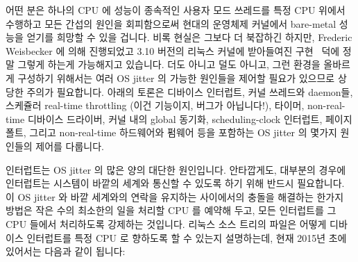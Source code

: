 어떤 분은 하나의 CPU 에 성능이 종속적인 사용자 모드 쓰레드를 특정 CPU 위에서
수행하고 모든 간섭의 원인을 회피함으로써 현대의 운영체제 커널에서 bare-metal
성능을 얻기를 희망할 수 있을 겁니다.
비록 현실은 그보다 더 북잡하긴 하지만, Frederic Weisbecker 에 의해 진행되었고
3.10 버전의 리눅스 커널에 받아들여진 
구현~\cite{JonCorbet2013NO-HZ-FULL} 덕에 정말 그렇게 하는게 가능해지고
있습니다.
더도 아니고 덜도 아니고, 그런 환경을 올바르게 구성하기 위해서는 여러 OS jitter
의 가능한 원인들을 제어할 필요가 있으므로 상당한 주의가 필요합니다.
아래의 토론은 디바이스 인터럽트, 커널 쓰레드와 daemon들, 스케쥴러 real-time
throttling (이건 기능이지, 버그가 아닙니다!), 타이머, non-real-time 디바이스
드라이버, 커널 내의 global 동기화, scheduling-clock 인터럽트, 페이지 폴트,
그리고 non-real-time 하드웨어와 펌웨어 등을 포함하는 OS jitter 의 몇가지
원인들의 제어를 다룹니다. 

인터럽트는 OS jitter 의 많은 양의 대단한 원인입니다.
안타깝게도, 대부분의 경우에 인터럽트는 시스템이 바깥의 세계와 통신할 수 있도록
하기 위해 반드시 필요합니다.
이 OS jitter 와 바깥 세계와의 연락을 유지하는 사이에서의 충돌을 해결하는 한가지
방법은 작은 수의 최소한의 일을 처리할 CPU 를 예약해 두고, 모든 인터럽트를 그
CPU 들에서 처리하도록 강제하는 것입니다.
리눅스 소스 트리의  파일은 어떻게 디바이스
인터럽트를 특정 CPU 로 향하도록 할 수 있는지 설명하는데, 현재 2015년 초에
있어서는 다음과 같이 됩니다:

